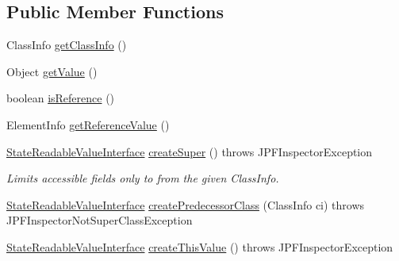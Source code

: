 \subsection*{Public Member Functions}
\begin{DoxyCompactItemize}
\item 
Class\+Info \hyperlink{interfacegov_1_1nasa_1_1jpf_1_1inspector_1_1server_1_1programstate_1_1_state_readable_value_interface_a7f2132a972c2fdd83ddf2f8ca85da191}{get\+Class\+Info} ()
\item 
Object \hyperlink{interfacegov_1_1nasa_1_1jpf_1_1inspector_1_1server_1_1programstate_1_1_state_readable_value_interface_a6bb9486c6b7de18915680f234d56d4d5}{get\+Value} ()
\item 
boolean \hyperlink{interfacegov_1_1nasa_1_1jpf_1_1inspector_1_1server_1_1programstate_1_1_state_readable_value_interface_a2f838619fd458febfe5a09b8c2687412}{is\+Reference} ()
\item 
Element\+Info \hyperlink{interfacegov_1_1nasa_1_1jpf_1_1inspector_1_1server_1_1programstate_1_1_state_readable_value_interface_ad56cb49db2120680a8ebffcc46d77871}{get\+Reference\+Value} ()
\item 
\hyperlink{interfacegov_1_1nasa_1_1jpf_1_1inspector_1_1server_1_1programstate_1_1_state_readable_value_interface}{State\+Readable\+Value\+Interface} \hyperlink{interfacegov_1_1nasa_1_1jpf_1_1inspector_1_1server_1_1programstate_1_1_state_readable_value_interface_a299f20e9db1151e4fdbe870583743799}{create\+Super} ()  throws J\+P\+F\+Inspector\+Exception
\begin{DoxyCompactList}\small\item\em Limits accessible fields only to from the given Class\+Info. \end{DoxyCompactList}\item 
\hyperlink{interfacegov_1_1nasa_1_1jpf_1_1inspector_1_1server_1_1programstate_1_1_state_readable_value_interface}{State\+Readable\+Value\+Interface} \hyperlink{interfacegov_1_1nasa_1_1jpf_1_1inspector_1_1server_1_1programstate_1_1_state_readable_value_interface_ae4e9a3d10684db8bdba8bf221c83e8fe}{create\+Predecessor\+Class} (Class\+Info ci)  throws J\+P\+F\+Inspector\+Not\+Super\+Class\+Exception
\item 
\hyperlink{interfacegov_1_1nasa_1_1jpf_1_1inspector_1_1server_1_1programstate_1_1_state_readable_value_interface}{State\+Readable\+Value\+Interface} \hyperlink{interfacegov_1_1nasa_1_1jpf_1_1inspector_1_1server_1_1programstate_1_1_state_readable_value_interface_a726b9bd70d7e76da89660f6a614d7fe1}{create\+This\+Value} ()  throws J\+P\+F\+Inspector\+Exception

\end{DoxyCompactItemize}
